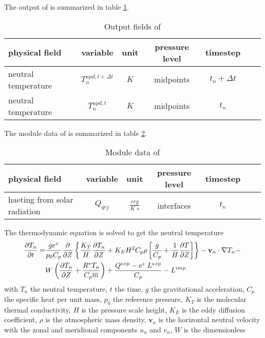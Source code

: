 %
The output of  is summarized in table
\ref{tab:output_dt}.
%
\begin{table}[tb]
\begin{tabular}{|p{3.5cm} ||c|c|c|c|c|c|} \hline
physical field               & variable        & unit&pressure
level& timestep \\ \hline \hline
neutral temperature    &       {$T_n^{upd,t+\Delta t}$}     & $K$   & midpoints  & $t_n+\Delta t$ \\
neutral temperature     &       {$T_n^{upd,t}$}     & $K$   &
midpoints & $t_n$
\\ \hline \hline
\end{tabular}
\caption{Output fields of } \label{tab:output_dt}
\end{table}
%
%
The module data of  is summarized in table
\ref{tab:module_dt}.
%
\begin{table}[tb]
\begin{tabular}{|p{3.5cm} ||c|c|c|c|c|c|} \hline
physical field               & variable        & unit&pressure
level& timestep \\ \hline \hline haeting from solar radiation    &
{$Q_{qrj}$}     & $\frac{erg}{K \; s}$   & interfaces  & $t_n$
\\ \hline \hline
\end{tabular}
\caption{Module data of } \label{tab:module_dt}
\end{table}
%
The thermodynamic equation is solved to get the neutral temperature
%
\begin{align}
  \frac{\partial T_n}{\partial t} = & \frac{g e^z}{p_0 C_p}\frac{\partial}{\partial Z}
  \left\{ \frac{K_T}{H} \frac{\partial T_n}{\partial Z} + K_E H^2 C_p \rho \left[
   \frac{g}{C_p} + \frac{1}{H}\frac{\partial T}{\partial
   Z}\right]\right\} - \mathbf{v}_n\cdot \nabla T_n - \notag  \\
   {}&  W \left(
   \frac{\partial T_n}{\partial Z} + \frac{R^* T_n}{C_p \overline{m}}
   \right) + \frac{Q^{exp}-e^z \; L^{exp}}{C_p} - L^{imp} \label{eq:dt_1}
\end{align}
%
with $T_n$ the neutral temperature, $t$ the time, $g$ the
gravitational acceleration, $C_p$ the specific heat per unit mass,
$p_0 $ the reference pressure, $K_T$ is the molecular thermal
conductivity, $H$ is the pressure scale height, $K_E$ is the eddy
diffusion coefficient, $\rho$ is the atmospheric mass density,
$\mathbf{v}_n$ is the horizontal neutral velocity with the zonal and
meridional components $u_n$ and $v_n$, $W$ is the dimensionless
